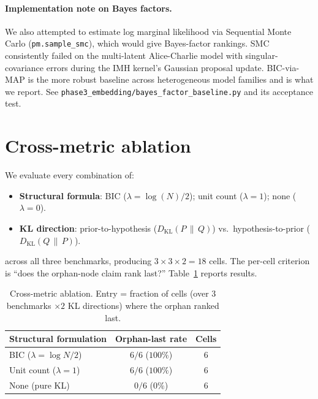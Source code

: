 \documentclass{article}
\begin{document}
\paragraph{Implementation note on Bayes factors.} We also attempted
to estimate log marginal likelihood via Sequential Monte Carlo
(\texttt{pm.sample\_smc}), which would give Bayes-factor rankings.
SMC consistently failed on the multi-latent Alice-Charlie model with
singular-covariance errors during the IMH kernel's Gaussian proposal
update. BIC-via-MAP is the more robust baseline across heterogeneous
model families and is what we report. See
\texttt{phase3\_embedding/bayes\_factor\_baseline.py} and its
acceptance test.

\section{Cross-metric ablation}
\label{sec:ablation}

We evaluate every combination of:
\begin{itemize}[leftmargin=*, itemsep=0pt]
\item \textbf{Structural formula}:
  BIC ($\lambda = \log(N) / 2$); unit count ($\lambda = 1$);
  none ($\lambda = 0$).
\item \textbf{KL direction}: prior-to-hypothesis
  ($D_{\mathrm{KL}}(P \,\|\, Q)$) vs.\ hypothesis-to-prior
  ($D_{\mathrm{KL}}(Q \,\|\, P)$).
\end{itemize}
across all three benchmarks, producing $3 \times 3 \times 2 = 18$
cells. The per-cell criterion is ``does the orphan-node claim rank
last?'' Table~\ref{tab:ablation} reports results.

\begin{table}[t]
\centering
\caption{Cross-metric ablation. Entry = fraction of cells
(over $3$ benchmarks $\times 2$ KL directions) where the orphan
ranked last.}
\label{tab:ablation}
\begin{tabular}{lcc}
\toprule
Structural formulation & Orphan-last rate & Cells \\
\midrule
BIC ($\lambda = \log N / 2$) & $6/6$ ($100\%$) & 6 \\
Unit count ($\lambda = 1$)   & $6/6$ ($100\%$) & 6 \\
None (pure KL)               & $0/6$ ($0\%$)   & 6 \\
\bottomrule
\end{tabular}
\end{table}
\end{document}
